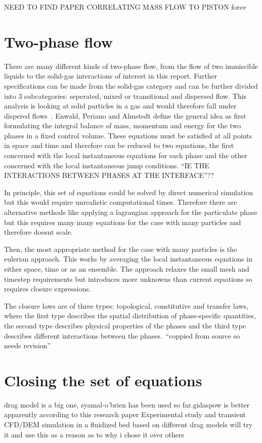 NEED TO FIND PAPER CORRELATING MASS FLOW TO PISTON force
\newpage
\section{Two-phase flow}
There are many different kinds of two-phase flow, from the flow of two immiscible liquids to the solid-gas interactions of interest in this report. Further specifications can be made from the solid-gas category and can be further divided into 3 subcategories: seperated, mixed or transitional and dispersed flow. This analysis is looking at solid particles in a gas and would therefore fall under dispered flows~\cite{enwald1996eulerian}. Enwald, Periano and Almstedt define the general idea as first formulating the integral balance of mass, momentum and energy for the two phases in a fixed control volume. These equations must be satisfied at all points in space and time and therefore can be reduced to two equations, the first concerned with the local instantaneous equations for each phase and the other concerned with the local instantaneous jump conditions. ``IE THE INTERACTIONS BETWEEN PHASES AT THE INTERFACE''??

In principle, this set of equations could be solved by direct numerical simulation but this would require unrealistic computational times. Therefore there are alternative methods like applying a lagrangian approach for the particulate phase but this requires many many equations for the case with many particles and therefore doesnt scale.

Then, the most appropriate method for the case with many particles is the eulerian approach. This works by averaging the local instantaneous equations in either space, time or as an ensemble. The approach relaxes the small mesh and timestep requirements but introduces more unknowns than current equations so requires closure expressions.

The closure laws are of three types: topological, constitutive and transfer laws, where the first type describes the spatial distribution of phase-specific quantities, the second type describes physical properties of the phases and the third type describes different interactions between the phases.~``coppied from source so needs revision''

\newpage
\section{Closing the set of equations}
drag model is a big one, syamal-o'brien has been used so far.gidaspow is better apparently according to this research paper Experimental study and transient CFD/DEM
simulation in a fluidized bed based on different
drag models
will try it and use this as a reason as to why i chose it over others

